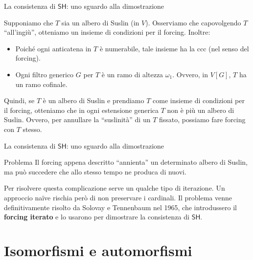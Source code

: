 \documentclass{beamer}
\theoremstyle{num.custom-title}
\theoremstyle{custom-title}
\newcommand{\SH}{\ensuremath{\mathsf{SH}}\xspace}
\renewcommand{\emph}[1]{\textbf{#1}}
\begin{document}
\begin{frame}{La consistenza di \SH: uno sguardo alla dimostrazione}

Supponiamo che $T$ sia un albero di Suslin (in $V$). Osserviamo che capovolgendo $T$ ``all'ingiù'', otteniamo un insieme di condizioni per il forcing. Inoltre:
\begin{itemize}
\item  Poiché ogni anticatena in $T$ è numerabile, tale insieme ha la ccc (nel senso del forcing).
\item Ogni filtro generico $G$ per $T$ è un ramo di altezza $\omega_1$. Ovvero, in $V[G]$, $T$ ha un ramo cofinale.
\end{itemize}

Quindi, se $T$ è un albero di Suslin e prendiamo $T$ come insieme di condizioni per il forcing, otteniamo che in ogni estensione generica $T$ non è più un albero di Suslin. Ovvero, per annullare la ``suslinità'' di un $T$ fissato, possiamo fare forcing con $T$ stesso.

\end{frame}


\begin{frame}{La consistenza di \SH: uno sguardo alla dimostrazione}

\begin{alertblock}{Problema}
Il forcing appena descritto ``annienta'' un determinato albero di Suslin, ma può succedere che allo stesso tempo ne produca di nuovi.
\end{alertblock}

Per risolvere questa complicazione serve un qualche tipo di iterazione. Un approccio naïve rischia però di non preservare i cardinali. Il problema venne definitivamente risolto da Solovay e Tennenbaum nel 1965, che introdussero il \emph{forcing iterato} e lo usarono per dimostrare la consistenza di \SH.

\end{frame}


\section{Isomorfismi e automorfismi}
\end{document}
